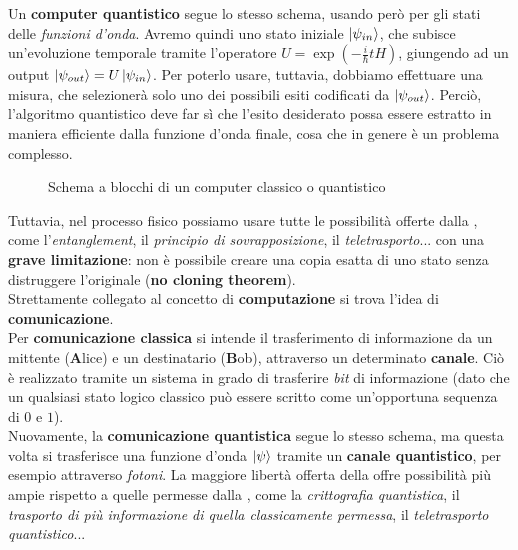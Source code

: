 \documentclass[../../InformazioneQuantistica.tex]{subfiles}
\begin{document}
Un \textbf{computer quantistico}  segue lo stesso schema, usando però per gli stati delle \textit{funzioni d'onda}. Avremo quindi uno stato iniziale $\Ket{\psi_{in}}$, che subisce un'evoluzione temporale tramite l'operatore $U=\exp\left(-\frac{i}{\hbar}tH\right)$, giungendo ad un output $\Ket{\psi_{out}}=U\Ket{\psi_{in}}$. Per poterlo usare, tuttavia, dobbiamo effettuare una misura, che selezionerà solo uno dei possibili esiti codificati da $\Ket{\psi_{out}}$. Perciò, l'algoritmo quantistico deve far sì che l'esito desiderato possa essere estratto in maniera efficiente dalla funzione d'onda finale, cosa che in genere è un problema complesso.

\begin{figure}[H]
\centering

\caption{Schema a blocchi di un computer classico o quantistico\label{fig:computer-classico-quantistico}}
\end{figure}

Tuttavia, nel processo fisico possiamo usare tutte le possibilità offerte dalla \MQ, come l'\textit{entanglement}, il \textit{principio di sovrapposizione}, il \textit{teletrasporto}... con una \textbf{grave limitazione}: non è possibile creare una copia esatta di uno stato senza distruggere l'originale (\textbf{no cloning theorem}).\\

Strettamente collegato al concetto di \textbf{computazione} si trova l'idea di \textbf{comunicazione}.\\

Per \textbf{comunicazione classica} si intende il trasferimento di informazione da un mittente (\textbf{A}lice) e un destinatario (\textbf{B}ob), attraverso un determinato \textbf{canale}. Ciò è realizzato tramite un sistema in grado di trasferire \textit{bit} di informazione (dato che un qualsiasi stato logico classico può essere scritto come un'opportuna sequenza di $0$ e $1$).\\

Nuovamente, la \textbf{comunicazione quantistica} segue lo stesso schema, ma questa volta si trasferisce una funzione d'onda $\Ket{\psi}$ tramite un \textbf{canale quantistico}, per esempio attraverso \textit{fotoni}. La maggiore libertà offerta della \MQ offre possibilità più ampie rispetto a quelle permesse dalla \MC, come la \textit{crittografia quantistica}, il \textit{trasporto di più informazione di quella classicamente permessa}, il \textit{teletrasporto quantistico}...
\end{document}
